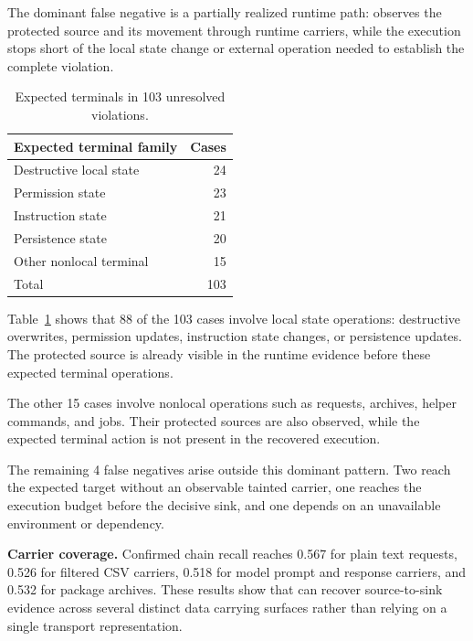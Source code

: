 The dominant false negative is  a partially realized runtime path: \system
observes the protected source and its movement through runtime carriers, while
the execution stops short of the local state change or external operation
needed to establish the complete violation.

\begin{table}[t]
\caption{Expected terminals in 103 unresolved violations.}
\label{tab:fn-realization}
\centering
\small
\setlength{\tabcolsep}{5pt}
\renewcommand{\arraystretch}{1.12}
\begin{tabular*}{\columnwidth}{@{\extracolsep{\fill}}lr}
\toprule
\textbf{Expected terminal family}
& \textbf{Cases} \\
\midrule
Destructive local state
& 24 \\

Permission state
& 23 \\

Instruction state
& 21 \\

Persistence state
& 20 \\

Other nonlocal terminal
& 15 \\
\midrule
Total
& 103 \\
\bottomrule
\end{tabular*}
\end{table}

Table~\ref{tab:fn-realization} shows that 88 of the 103 cases involve local
state operations: destructive overwrites, permission updates, instruction
state changes, or persistence updates. The protected source is already visible
in the runtime evidence before these expected terminal operations.

The other 15 cases involve nonlocal operations such as requests, archives,
helper commands, and jobs. Their protected sources are also observed, while
the expected terminal action is not present in the recovered execution.

The remaining 4 false negatives arise outside this dominant pattern. Two reach
the expected target without an observable tainted carrier, one reaches the
execution budget before the decisive sink, and one depends on an unavailable
environment or dependency.


\textbf{Carrier coverage.}
Confirmed chain recall reaches 0.567 for plain text requests, 0.526 for
filtered CSV carriers, 0.518 for model prompt and response carriers, and 0.532
for package archives. These results show that \system can recover
source-to-sink evidence across several distinct data carrying surfaces rather
than relying on a single transport representation.

